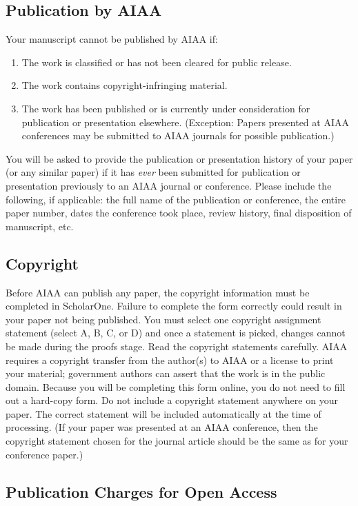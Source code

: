 \documentclass[journal]{new-aiaa}
\begin{document}
\subsection{Publication by AIAA}
Your manuscript cannot be published by AIAA if:
\begin{enumerate}
\item The work is classified or has not been cleared for public release.
\item The work contains copyright-infringing material.
\item The work has been published or is currently under consideration for publication or presentation elsewhere. (Exception: Papers presented at AIAA conferences may be submitted to AIAA journals for possible publication.)
\end{enumerate}

You will be asked to provide the publication or presentation history of your paper (or any similar paper) if it has \emph{ever} been submitted for publication or presentation previously to an AIAA journal or conference. Please include the following, if applicable: the full name of the publication or conference, the entire paper number, dates the conference took place, review history, final disposition of manuscript, etc.


\subsection{Copyright}

Before AIAA can publish any paper, the copyright information must be completed in ScholarOne. Failure to complete the form correctly could result in your paper not being published. You must select one copyright assignment statement (select A, B, C, or D) and once a statement is picked, changes cannot be made during the proofs stage. Read the copyright statements carefully. AIAA requires a copyright transfer from the author(s) to AIAA or a license to print your material; government authors can assert that the work is in the public domain. Because you will be completing this form online, you do not need to fill out a hard-copy form. Do not include a copyright statement anywhere on your paper. The correct statement will be included automatically at the time of processing. (If your paper was presented at an AIAA conference, then the copyright statement chosen for the journal article should be the same as for your conference paper.)

\subsection{Publication Charges for Open Access}
\end{document}
